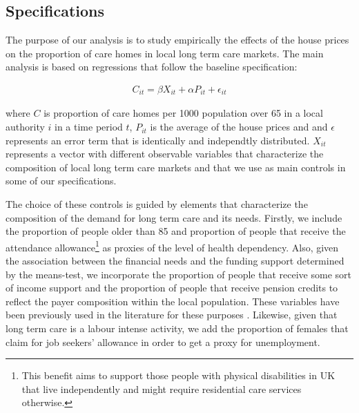 \documentclass[12pt,letterpaper]{article}
\begin{document}
\title{}


\date{}
 \maketitle
%
%
%
%




\subsection*{Specifications}



The purpose of our analysis is to study empirically the effects of the house prices on the proportion of care homes in local
  long term care markets. The main analysis is based on regressions that follow the baseline 
specification:
 
 \begin{eqnarray}
\label{equation1}
      C_{it} =\beta X_{it} + \alpha P_{it} + \epsilon_{it}
 \end{eqnarray}

 where $C$ is proportion of care homes per 1000 population over 65 in a local authority $i$ in a time period $t$,
  $P_{it}$ is the average of the house prices and 
 and $\epsilon$ represents an error term that is identically and independtly distributed.  $X_{it}$
  represents a vector with different observable variables
 that characterize the composition of local long term care markets and that we use as main controls in some 
 of our specifications. 
 
 The choice of these controls is guided by elements that characterize the composition of the demand 
for long term care and its needs. Firstly, we include the proportion 
  of people older than 85 and proportion of people that receive the attendance 
  allowance\footnote{This benefit aims to support those people with physical disabilities in UK that live
   independently and might require residential care services otherwise. } as proxies of the level 
   of health dependency. Also, given the association between the financial needs and the funding
    support determined by the means-test, we incorporate the proportion of people that receive some
     sort of income support and the proportion of people that receive pension credits to reflect the payer 
     composition within the local population. These variables have been previously used in the literature for these purposes 
     \citep{darton2010slicing, forder2014}. Likewise, given that long term care is a labour intense activity,
      we add the proportion of females that claim for job seekers’ allowance in order to get a proxy for unemployment.
      
\end{document}
